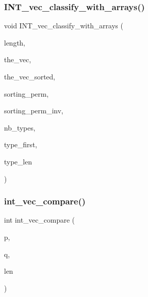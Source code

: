 \mbox{\label{sorting_8_c_a1b3700c1d369b8a37593a1c2f31cc9d7}} 
\subsubsection{\texorpdfstring{I\+N\+T\+\_\+vec\+\_\+classify\+\_\+with\+\_\+arrays()}{INT\_vec\_classify\_with\_arrays()}}
{\footnotesize\ttfamily void I\+N\+T\+\_\+vec\+\_\+classify\+\_\+with\+\_\+arrays (\begin{DoxyParamCaption}\item[{\mbox{\hyperlink{galois_8h_a09fddde158a3a20bd2dcadb609de11dc}{I\+NT}}}]{length,  }\item[{\mbox{\hyperlink{galois_8h_a09fddde158a3a20bd2dcadb609de11dc}{I\+NT}} $\ast$}]{the\+\_\+vec,  }\item[{\mbox{\hyperlink{galois_8h_a09fddde158a3a20bd2dcadb609de11dc}{I\+NT}} $\ast$}]{the\+\_\+vec\+\_\+sorted,  }\item[{\mbox{\hyperlink{galois_8h_a09fddde158a3a20bd2dcadb609de11dc}{I\+NT}} $\ast$}]{sorting\+\_\+perm,  }\item[{\mbox{\hyperlink{galois_8h_a09fddde158a3a20bd2dcadb609de11dc}{I\+NT}} $\ast$}]{sorting\+\_\+perm\+\_\+inv,  }\item[{\mbox{\hyperlink{galois_8h_a09fddde158a3a20bd2dcadb609de11dc}{I\+NT}} \&}]{nb\+\_\+types,  }\item[{\mbox{\hyperlink{galois_8h_a09fddde158a3a20bd2dcadb609de11dc}{I\+NT}} $\ast$}]{type\+\_\+first,  }\item[{\mbox{\hyperlink{galois_8h_a09fddde158a3a20bd2dcadb609de11dc}{I\+NT}} $\ast$}]{type\+\_\+len }\end{DoxyParamCaption})}

\mbox{\label{sorting_8_c_af4483f0f754d0145b5bfea5741a94f28}} 
\subsubsection{\texorpdfstring{int\+\_\+vec\+\_\+compare()}{int\_vec\_compare()}}
{\footnotesize\ttfamily int int\+\_\+vec\+\_\+compare (\begin{DoxyParamCaption}\item[{int $\ast$}]{p,  }\item[{int $\ast$}]{q,  }\item[{int}]{len }\end{DoxyParamCaption})}

